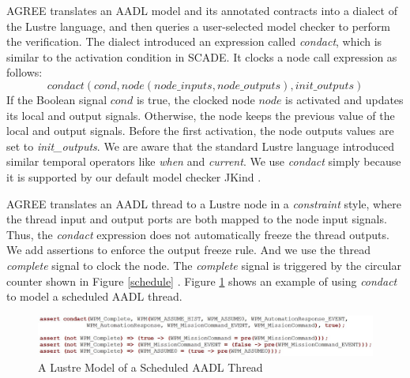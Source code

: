 AGREE translates an AADL model and its annotated contracts into a dialect \cite{jkind} of the Lustre language, and then queries a user-selected model checker to perform the verification. The dialect introduced an expression called \emph{condact}, which is similar to the activation condition in SCADE. It clocks a node call expression as follows: 
\begin{equation*}
condact (cond, node(node\_inputs, node\_outputs), init\_outputs)
\end{equation*}
If the Boolean signal $cond$ is true, the clocked node $node$ is activated and updates its local and output signals. Otherwise, the node keeps the previous value of the local and output signals. Before the first activation, the node outputs values are set to \emph{init\_outputs}. %
We are aware that the standard Lustre language introduced similar temporal operators like \emph{when} and \emph{current}. We use \emph{condact} simply because it is supported by our default model checker JKind \cite{jkind}.

AGREE translates an AADL thread to a Lustre node in a \emph{constraint} style, where the thread input and output ports are both mapped to the node input signals. Thus, the \emph{condact} expression does not automatically freeze the thread outputs. We add assertions to enforce the output freeze rule. And we use the thread \emph{complete} signal to clock the node. The \emph{complete} signal is triggered by the circular counter shown in Figure \ref{schedule} . Figure \ref{WPMlustre} shows an example of using \emph{condact} to model a scheduled AADL thread. 

\begin{figure}[ht!]
\centering
\includegraphics[width=120mm]{lustreAsync5.jpg}
\caption{A Lustre Model of a Scheduled AADL Thread \label{WPMlustre}}
\end{figure}

%
%

